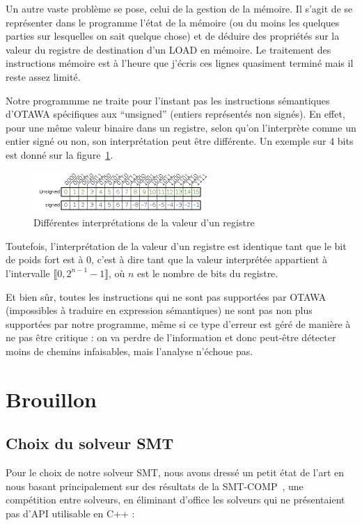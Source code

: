 \documentclass[french]{article}
\begin{document}
  Un autre vaste problème se pose, celui de la gestion de la mémoire. Il s'agit de se représenter dans le programme l'état de la mémoire (ou du moins les quelques parties sur lesquelles on sait quelque chose) et de déduire des propriétés sur la valeur du registre de destination d'un LOAD en mémoire. Le traitement des instructions mémoire est à l'heure que j'écris ces lignes quasiment terminé mais il reste assez limité.
  
  Notre programmme ne traite pour l'instant pas les instructions sémantiques d'OTAWA spécifiques aux ``unsigned'' (entiers représentés non signés). En effet, pour une même valeur binaire dans un registre, selon qu'on l'interprète comme un entier signé ou non, son interprétation peut être différente. Un exemple sur 4 bits est donné sur la figure~\ref{representation_signed_unsigned}.
  
  \begin{figure}
    \centering
    \includegraphics[width=250px]{pictures/representation_signed_unsigned.png}
    \caption{Différentes interprétations de la valeur d'un registre}
    \label{representation_signed_unsigned}
  \end{figure}

  Toutefois, l'interprétation de la valeur d'un registre est identique tant que le bit de poids fort est à 0, c'est à dire tant que la valeur interprétée appartient à l'intervalle $\llbracket0, 2^{n-1}-1\rrbracket$, où $n$ est le nombre de bits du registre.
  
  Et bien sûr, toutes les instructions qui ne sont pas supportées par OTAWA (impossibles à traduire en expression sémantiques) ne sont pas non plus supportées par notre programme, même si ce type d'erreur est géré de manière à ne pas être critique : on va perdre de l'information et donc peut-être détecter moins de chemins infaisables, mais l'analyse n'échoue pas.
  
  \section{Brouillon}
  \subsection{Choix du solveur SMT}
  Pour le choix de notre solveur SMT, nous avons dressé un petit état de l'art en nous basant principalement sur des résultats de la SMT-COMP~\cite{SMT-COMP}, une compétition entre solveurs, en éliminant d'office les solveurs qui ne présentaient pas d'API utilisable en C++ :
  
\end{document}
